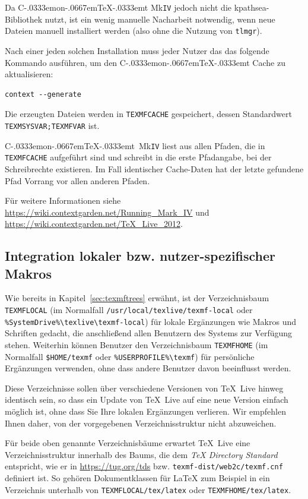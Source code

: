 \documentclass[12pt,ngerman,a4paper,fullparskip]{scrreprt}
\newcommand{\TL}{\TeX\ Live\xspace}
\newcommand{\acro}[1]{\texttt{#1}}
\newcommand{\code}[1]{\texttt{#1}}
\newcommand{\filename}[1]{\texttt{#1}}
\newcommand{\dirname}[1]{\texttt{#1}}
\newcommand\ConTeXt{C\kern-.0333emon\-\kern-.0667em\TeX\kern-.0333emt}
\begin{document}
Da \ConTeXt{} Mk\acro{IV} jedoch nicht die kpathsea-Bibliothek nutzt, ist
ein wenig manuelle Nacharbeit notwendig, wenn neue Dateien manuell installiert werden (also ohne die Nutzung von \verb+tlmgr+).

Nach einer jeden solchen Installation muss jeder Nutzer das das folgende Kommando ausführen, um den \ConTeXt{} Cache zu aktualisieren:

\begin{verbatim}
context --generate
\end{verbatim}

Die erzeugten Dateien werden in \code{TEXMFCACHE} gespeichert, dessen Standardwert \verb+TEXMSYSVAR;TEXMFVAR+ ist. 

\ConTeXt\ Mk\acro{IV} liest aus allen Pfaden, die in \verb+TEXMFCACHE+ aufgeführt sind und schreibt in die erste Pfadangabe, bei der Schreibrechte existieren. Im Fall identischer Cache-Daten hat der letzte gefundene Pfad Vorrang vor allen anderen Pfaden.

Für weitere Informationen siehe
\url{https://wiki.contextgarden.net/Running_Mark_IV} und
\url{https://wiki.contextgarden.net/TeX_Live_2012}.

\subsection{Integration lokaler bzw. nutzer-spezifischer Makros}
\label{sec:local-personal-macros}

Wie bereits in Kapitel~\ref{sec:texmftrees} erwähnt, ist der Verzeichnisbaum \dirname{TEXMFLOCAL} (im Normalfall \dirname{/usr/local/texlive/texmf-local} oder \verb|%SystemDrive%\texlive\|\newline \verb|texmf-local|) für lokale Ergänzungen wie Makros und Schriften gedacht, die anschließend allen Benutzern des Systems zur Verfügung stehen. Weiterhin können Benutzer den Verzeichnisbaum \dirname{TEXMFHOME} (im Normalfall \dirname{\$HOME/texmf} oder \verb|%USERPROFILE%\texmf|) für persönliche Ergänzungen verwenden, ohne dass andere Benutzer davon beeinflusst werden.

Diese Verzeichnisse sollen über verschiedene Versionen von \TL hinweg identisch sein, so dass ein Update von \TL auf eine neue Version einfach möglich ist, ohne dass Sie Ihre lokalen Ergänzungen verlieren. Wir empfehlen Ihnen daher, von der vorgegebenen Verzeichnisstruktur nicht abzuweichen.

Für beide oben genannte Verzeichnisbäume erwartet \TL eine Verzeichnisstruktur innerhalb des Baums, die dem \emph{\TeX{} Directory Standard} entspricht, wie er in \url{https://tug.org/tds} bzw. \filename{texmf-dist/web2c/texmf.cnf} definiert ist.
So gehören Dokumentklassen für \LaTeX{} zum Beispiel in ein Verzeichnis
unterhalb von \dirname{TEXMFLOCAL/tex/latex} oder \dirname{TEXMFHOME/tex/latex}.
\end{document}
